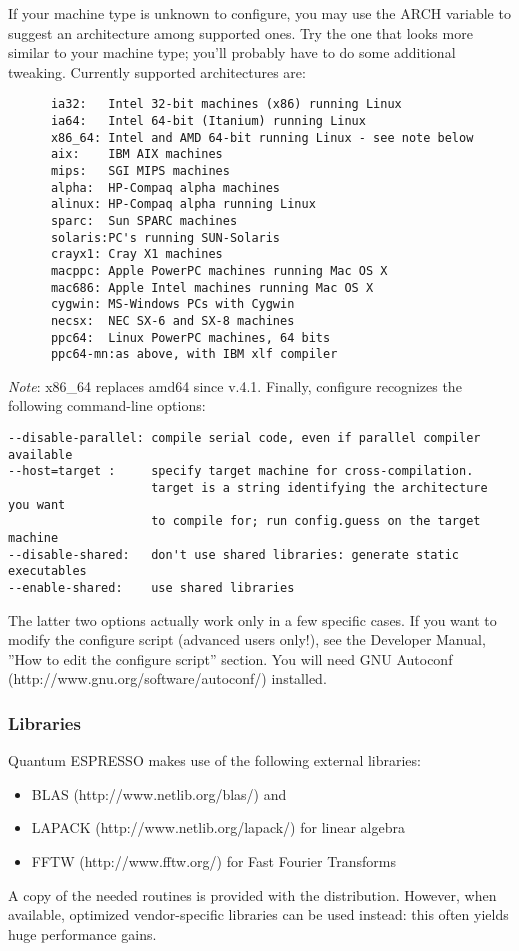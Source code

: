 \documentclass[12pt,a4paper]{article}
\begin{document}
If your machine type is unknown to configure, you may use the ARCH
variable to suggest an architecture among supported ones. Try the one that
looks more similar to your machine type; you'll probably have to do some
additional tweaking. Currently supported architectures are:
\begin{verbatim}
      ia32:   Intel 32-bit machines (x86) running Linux
      ia64:   Intel 64-bit (Itanium) running Linux
      x86_64: Intel and AMD 64-bit running Linux - see note below
      aix:    IBM AIX machines
      mips:   SGI MIPS machines
      alpha:  HP-Compaq alpha machines
      alinux: HP-Compaq alpha running Linux
      sparc:  Sun SPARC machines
      solaris:PC's running SUN-Solaris
      crayx1: Cray X1 machines
      macppc: Apple PowerPC machines running Mac OS X
      mac686: Apple Intel machines running Mac OS X
      cygwin: MS-Windows PCs with Cygwin
      necsx:  NEC SX-6 and SX-8 machines
      ppc64:  Linux PowerPC machines, 64 bits
      ppc64-mn:as above, with IBM xlf compiler
\end{verbatim}
{\em Note}: x86\_64 replaces amd64 since v.4.1. 
Finally, configure recognizes the following command-line options:
\begin{verbatim}
--disable-parallel: compile serial code, even if parallel compiler available
--host=target :     specify target machine for cross-compilation.
                    target is a string identifying the architecture you want
                    to compile for; run config.guess on the target machine
--disable-shared:   don't use shared libraries: generate static executables
--enable-shared:    use shared libraries
\end{verbatim}
The latter two options actually work only in a few specific cases.
If you want to modify the configure script (advanced users only!), see the 
Developer Manual, ''How to edit the configure script'' section. 
You will need GNU Autoconf (http://www.gnu.org/software/autoconf/)
installed.

\subsubsection{Libraries}

Quantum ESPRESSO makes use of the following external libraries:
\begin{itemize}
\item BLAS (http://www.netlib.org/blas/) and 
\item LAPACK (http://www.netlib.org/lapack/) for linear algebra 
\item FFTW (http://www.fftw.org/) for Fast Fourier Transforms
\end{itemize}
A copy of the needed routines is provided with the distribution. However,
when available, optimized vendor-specific libraries can be used instead: this
often yields huge performance gains.
\end{document}
